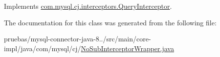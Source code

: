 Implements \mbox{\hyperlink{interfacecom_1_1mysql_1_1cj_1_1interceptors_1_1_query_interceptor_a1613f5491fdb4610d5727d60c904e7e2}{com.\+mysql.\+cj.\+interceptors.\+Query\+Interceptor}}.



The documentation for this class was generated from the following file\+:\begin{DoxyCompactItemize}
\item 
pruebas/mysql-\/connector-\/java-\/8../src/main/core-\/impl/java/com/mysql/cj/\mbox{\hyperlink{_no_sub_interceptor_wrapper_8java}{No\+Sub\+Interceptor\+Wrapper.\+java}}\end{DoxyCompactItemize}
